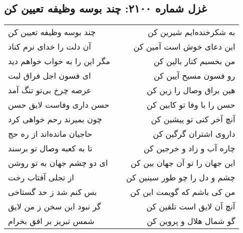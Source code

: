 \begin{center}
\section*{غزل شماره ۲۱۰۰: چند بوسه وظیفه تعیین کن}
\label{sec:2100}
\begin{longtable}{l p{0.5cm} r}
چند بوسه وظیفه تعیین کن
&&
به شکرخنده‌ایم شیرین کن
\\
آن دلت را خدای نرم کناد
&&
این دعای خوش است آمین کن
\\
مگر این را به خواب خواهم دید
&&
من بخسبم کنار بالین کن
\\
ای فسون اجل فراق لبت
&&
رو فسون مسیح آیین کن
\\
عرصه چرخ بی‌تو تنگ آمد
&&
هین براق وصال را زین کن
\\
حسن داری وفاست لایق حسن
&&
حسن را با وفا تو کابین کن
\\
چون بمیرند رحم خواهی کرد
&&
آنچ آخر کنی تو پیشین کن
\\
حاجیان مانده‌اند از ره حج
&&
داروی اشتران گرگین کن
\\
تا به کعبه وصال تو برسند
&&
چاره آب و زاد و خرجین کن
\\
ای دو چشم جهان به تو روشن
&&
این جهان را تو آن جهان بین کن
\\
از تجلی آفتاب رخت
&&
چشم و دل را چو طور سینین کن
\\
بس کنم شد ز حد گستاخی
&&
من کی باشم که گویمت این کن
\\
گر نبود این سخن ز من لایق
&&
آنچ آن لایق است تلقین کن
\\
شمس تبریز بر افق بخرام
&&
گو شمال هلال و پروین کن
\\
\end{longtable}
\end{center}
